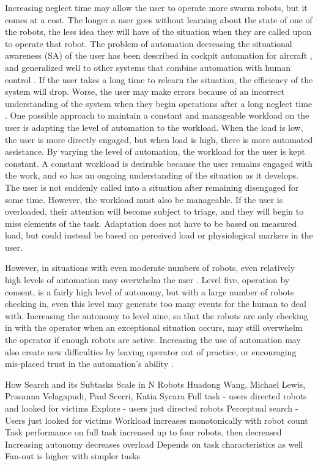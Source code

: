 Increasing neglect time may allow the user to operate more swarm robots, but it comes at a cost. 
The longer a user goes without learning about the state of one of the robots, the less idea they will have of the situation when they are called upon to operate that robot. 
The problem of automation decreasing the situational awareness (SA) of the user has been described in cockpit automation for aircraft \cite{wiener1980flight}, and generalized well to other systems that combine automation with human control \cite{kaber1997out}. 
If the user takes a long time to relearn the situation, the efficiency of the system will drop. 
Worse, the user may make errors because of an incorrect understanding of the system when they begin operations after a long neglect time \cite{cummings2008predicting}. 
One possible approach to maintain a constant and manageable workload on the user is adapting the level of automation to the workload. 
When the load is low, the user is more directly engaged, but when load is high, there is more automated assistance. 
By varying the level of automation, the workload for the user is kept constant. 
A constant workload is desirable because the user remains engaged with the work, and so has an ongoing understanding of the situation as it develops. 
The user is not suddenly called into a situation after remaining disengaged for some time. 
However, the workload must also be manageable. 
If the user is overloaded, their attention will become subject to triage, and they will begin to miss elements of the task. 
Adaptation does not have to be based on measured load, but could instead be based on perceived load or physiological markers in the user. 

However, in situations with even moderate numbers of robots, even relatively high levels of automation may overwhelm the user \cite{lewis200617}. 
Level five, operation by consent, is a fairly high level of autonomy, but with a large number of robots checking in, even this level may generate too many events for the human to deal with. 
Increasing the autonomy to level nine, so that the robots are only checking in with the operator when an exceptional situation occurs, may still overwhelm the operator if enough robots are active.
Increasing the use of automation may also create new difficulties by leaving operator out of practice, or encouraging mis-placed trust in the automation's ability \cite{lee2004trust}. 


How Search and its Subtasks Scale in N Robots
Huadong Wang, Michael Lewis, Prasanna Velagapudi, Paul Scerri, Katia Sycara
	Full task - users directed robots and looked for victims
	Explore - users just directed robots
	Perceptual search - Users just looked for victims
	Workload increases monotonically with robot count
	Task performance on full task increased up to four robots, then decreased
	Increasing autonomy decreases overload
		Depends on task characteristics as well
		Fan-out is higher with simpler tasks

